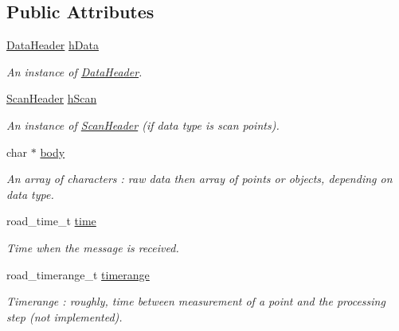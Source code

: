 \subsection*{Public Attributes}
\begin{DoxyCompactItemize}
\item 
\hypertarget{classpacpus_1_1MessageLDMRS_a0de8de7be8864e2eb153c1b58b597a86}{\hyperlink{structpacpus_1_1DataHeader}{Data\-Header} \hyperlink{classpacpus_1_1MessageLDMRS_a0de8de7be8864e2eb153c1b58b597a86}{h\-Data}}\label{classpacpus_1_1MessageLDMRS_a0de8de7be8864e2eb153c1b58b597a86}

\begin{DoxyCompactList}\small\item\em An instance of \hyperlink{structpacpus_1_1DataHeader}{Data\-Header}. \end{DoxyCompactList}\item 
\hypertarget{classpacpus_1_1MessageLDMRS_aa67a394ee95860cf887abb671b53fc8f}{\hyperlink{structpacpus_1_1ScanHeader}{Scan\-Header} \hyperlink{classpacpus_1_1MessageLDMRS_aa67a394ee95860cf887abb671b53fc8f}{h\-Scan}}\label{classpacpus_1_1MessageLDMRS_aa67a394ee95860cf887abb671b53fc8f}

\begin{DoxyCompactList}\small\item\em An instance of \hyperlink{structpacpus_1_1ScanHeader}{Scan\-Header} (if data type is scan points). \end{DoxyCompactList}\item 
char $\ast$ \hyperlink{classpacpus_1_1MessageLDMRS_a33219ceede2224cd2cece39772d1012b}{body}
\begin{DoxyCompactList}\small\item\em An array of characters \-: raw data then array of points or objects, depending on data type. \end{DoxyCompactList}\item 
\hypertarget{classpacpus_1_1MessageLDMRS_adf281676d8146037ecf51805d0e6217e}{road\-\_\-time\-\_\-t \hyperlink{classpacpus_1_1MessageLDMRS_adf281676d8146037ecf51805d0e6217e}{time}}\label{classpacpus_1_1MessageLDMRS_adf281676d8146037ecf51805d0e6217e}

\begin{DoxyCompactList}\small\item\em Time when the message is received. \end{DoxyCompactList}\item 
\hypertarget{classpacpus_1_1MessageLDMRS_a3f6e1a477d895f8f9d228669f559cb2d}{road\-\_\-timerange\-\_\-t \hyperlink{classpacpus_1_1MessageLDMRS_a3f6e1a477d895f8f9d228669f559cb2d}{timerange}}\label{classpacpus_1_1MessageLDMRS_a3f6e1a477d895f8f9d228669f559cb2d}

\begin{DoxyCompactList}\small\item\em Timerange \-: roughly, time between measurement of a point and the processing step (not implemented). \end{DoxyCompactList}\end{DoxyCompactItemize}


